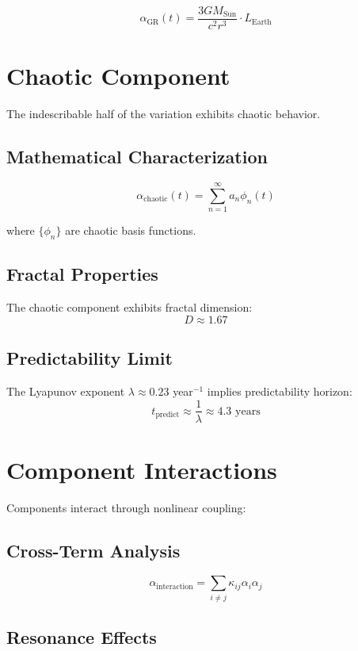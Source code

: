 \documentclass[12pt,a4paper]{report}
\begin{document}
\[
\alpha_{\text{GR}}(t) = \frac{3GM_{\text{Sun}}}{c^2 r^3} \cdot L_{\text{Earth}}
\]

\section{Chaotic Component}

The indescribable half of the variation exhibits chaotic behavior.

\subsection{Mathematical Characterization}

\[
\alpha_{\text{chaotic}}(t) = \sum_{n=1}^{\infty} a_n \phi_n(t)
\]

where $\{\phi_n\}$ are chaotic basis functions.

\subsection{Fractal Properties}

The chaotic component exhibits fractal dimension:
\[
D \approx 1.67
\]

\subsection{Predictability Limit}

The Lyapunov exponent $\lambda \approx 0.23$ year$^{-1}$ implies predictability horizon:
\[
t_{\text{predict}} \approx \frac{1}{\lambda} \approx 4.3 \text{ years}
\]

\section{Component Interactions}

Components interact through nonlinear coupling:

\subsection{Cross-Term Analysis}

\[
\alpha_{\text{interaction}} = \sum_{i \neq j} \kappa_{ij} \alpha_i \alpha_j
\]

\subsection{Resonance Effects}
\end{document}
